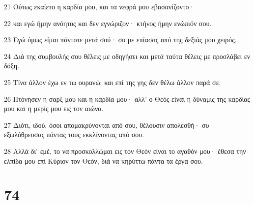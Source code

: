 \par 21 Ούτως εκαίετο η καρδία μου, και τα νεφρά μου εβασανίζοντο·
\par 22 και εγώ ήμην ανόητος και δεν εγνώριζον· κτήνος ήμην ενώπιόν σου.
\par 23 Εγώ όμως είμαι πάντοτε μετά σού· συ με επίασας από της δεξιάς μου χειρός.
\par 24 Διά της συμβουλής σου θέλεις με οδηγήσει και μετά ταύτα θέλεις με προσλάβει εν δόξη.
\par 25 Τίνα άλλον έχω εν τω ουρανώ; και επί της γης δεν θέλω άλλον παρά σε.
\par 26 Ητόνησεν η σαρξ μου και η καρδία μου· αλλ' ο Θεός είναι η δύναμις της καρδίας μου και η μερίς μου εις τον αιώνα.
\par 27 Διότι, ιδού, όσοι απομακρύνονται από σου, θέλουσιν απολεσθή· συ εξωλόθρευσας πάντας τους εκκλίνοντας από σου.
\par 28 Αλλά δι' εμέ, το να προσκολλώμαι εις τον Θεόν είναι το αγαθόν μου· έθεσα την ελπίδα μου επί Κύριον τον Θεόν, διά να κηρύττω πάντα τα έργα σου.

\chapter{74}

